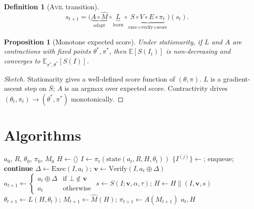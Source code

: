 \documentclass[10pt,twocolumn,letterpaper]{article}
\theoremstyle{definition}
\newtheorem{definition}{Definition}[section]
\theoremstyle{plain}
\newtheorem{proposition}{Proposition}[section]
\newcommand{\AVIL}{\textsc{Avil}}
\begin{document}
\begin{definition}[\AVIL{} transition]\label{def:transition}
\[
s_{t+1}=
\bigl(\underbrace{A\circ\widehat{M}}_{\text{adapt}}\circ
\underbrace{L}_{\text{learn}}\circ
\underbrace{S\circ V\circ E\circ\pi_t}_{\text{exec+verify+score}}
\bigr)(s_t).
\]
\end{definition}

\begin{proposition}[Monotone expected score]
Under stationarity, if $L$ and $A$ are contractions with fixed points
$\theta^\ast,\pi^\ast$, then $\mathbb{E}[S(I_t)]$ is non-decreasing
and converges to
$\mathbb{E}_{\pi^\ast,\theta^\ast}[S(I)]$.
\end{proposition}

\begin{proof}[Sketch]
Stationarity gives a well-defined score function of $(\theta,\pi)$.
$L$ is a gradient-ascent step on $\overline{S}$; $A$ is an argmax
over expected score. Contractivity drives
$(\theta_t,\pi_t)\to(\theta^\ast,\pi^\ast)$ monotonically.
\end{proof}

\section{Algorithms}\label{sec:algorithms}

\begin{algorithm}[t]
\caption{\AVIL{} main loop}\label{alg:avil}
\begin{algorithmic}[1]
\small
\Require $a_0$, $R$, $\theta_0$, $\pi_0$, $M_0$
\State $H\gets\langle\rangle$
  \State $I\gets\pi_t(\mathrm{state}(a_t,R,H,\theta_t))$
     \State $\{I^{(j)}\}\gets$; enqueue; \textbf{continue}
  \EndIf
  \State $\Delta\gets\mathrm{Exec}(I,a_t)$;\;
         $\mathbf{v}\gets\mathrm{Verify}(I,a_t\oplus\Delta)$
  \State $a_{t+1}\gets
         \begin{cases}a_t\oplus\Delta&\text{if }\bot\notin\mathbf{v}\\
         a_t&\text{otherwise}\end{cases}$
  \State $s\gets S(I;\mathbf{v},\alpha,\tau)$;\;
         $H\gets H\|(I,\mathbf{v},s)$
  \State $\theta_{t+1}\gets L(H,\theta_t)$;\;
         $M_{t+1}\gets\widehat{M}(H)$;\;
         $\pi_{t+1}\gets A(M_{t+1})$
\EndFor
\State\Return $a_t,H$
\end{algorithmic}
\end{algorithm}
\end{document}
